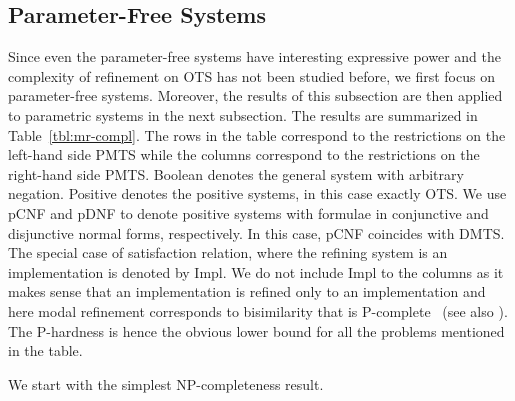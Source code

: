 \subsection{Parameter-Free Systems}

Since even the parameter-free systems have interesting expressive
power and the complexity of refinement on OTS has not been studied
before, 
we first focus on parameter-free systems.
Moreover, the results of this subsection are then applied
to parametric systems in the next subsection.
The results are summarized in Table~\ref{tbl:mr-compl}.
The rows in the table correspond 
to the restrictions on the left-hand side PMTS while the columns correspond 
to the restrictions on the right-hand side PMTS. Boolean denotes the general 
system with arbitrary negation. Positive denotes the positive systems, 
in this case exactly OTS. We use pCNF and pDNF to denote positive systems 
with formulae in conjunctive and disjunctive normal forms, respectively. 
In this case, pCNF coincides with DMTS. The special case of satisfaction 
relation, where the refining system is an implementation is denoted by Impl.
We do not include Impl to the columns as it makes sense that 
an implementation is refined only to an implementation and here modal
refinement corresponds to %
bisimilarity that is 
P-complete~\cite{balcazar1992dbp} (see also \cite{SawaJ05}). 
The P-hardness is hence the obvious lower bound for all the 
problems mentioned in the table. 



We start with the simplest NP-completeness result. %


